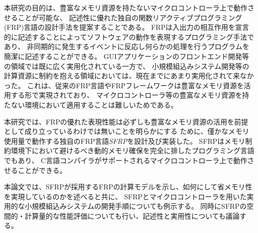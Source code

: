 本研究の目的は、豊富なメモリ資源を持たないマイクロコントローラ上で動作させることが可能な、
記述性に優れた独自の関数リアクティブプログラミング(FRP)言語の設計手法を提案することである。
FRPは入出力の相互作用を宣言的に記述することによってソフトウェアの動作を表現するプログラミング手法であり、
非同期的に発生するイベントに反応し何らかの処理を行うプログラムを簡潔に記述することができる。
GUIアプリケーションのフロントエンド開発等の領域では既に広く実用化されている一方で、
小規模組込みシステム開発等の計算資源に制約を抱える領域においては、現在までにあまり実用化されて来なかった。
これは、従来のFRP言語やFRPフレームワークは豊富なメモリ資源を活用する形で実現されており、
マイクロコントローラ等の豊富なメモリ資源を持たない環境において適用することは難しいためである。

本研究では、FRPの優れた表現性能は必ずしも豊富なメモリ資源の活用を前提として成り立っているわけでは無いことを明らかにする
ために、僅かなメモリ使用量で動作する独自のFRP言語{\it SFRP}を設計及び実装した。
SFRPはメモリ制約環境下において避けるべき動的メモリ確保を完全に排したプログラミング言語でもあり、
C言語コンパイラがサポートされるマイクロコントローラ上で動作させることができる。

本論文では、SFRPが採用するFRPの計算モデルを示し、如何にして省メモリ性を実現しているのかを述べると共に、
SFRPとマイクロコントローラを用いた実用的な小規模組込みシステムの開発手順についても例示する。
同時にSFRPの空間的・計算量的な性能評価についても行い、記述性と実用性についても議論する。
